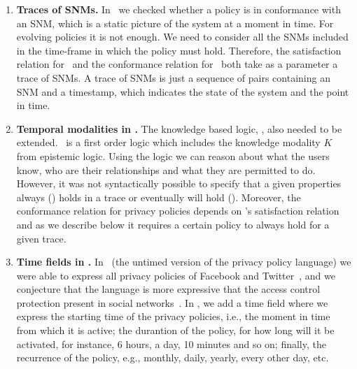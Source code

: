 \begin{enumerate}
\item \textbf{Traces of SNMs.} In \fppf~we checked whether a policy is in conformance with an SNM, which is a static picture of the system at a moment in time. For evolving policies it is not enough. We need to consider all the SNMs included in the time-frame in which the policy must hold. Therefore, the satisfaction relation for \tkbl~and the conformance relation for \tppl~both take as a parameter a trace of SNMs. A trace of SNMs is just a sequence of pairs containing an SNM and a timestamp, which indicates the state of the system and the point in time.
  
\item \textbf{Temporal modalities in \tkbl.} The knowledge based logic, \kbl, also needed to be extended. \kbl~is a first order logic which includes the knowledge modality $K$ from epistemic logic. Using the logic we can reason about what the users know, who are their relationships and what they are permitted to do. However, it was not syntactically possible to specify that a given properties always (\al) holds in a trace or eventually will hold (\ev). Moreover, the conformance relation for privacy policies depends on \tkbl's satisfaction relation and as we describe below it requires a certain policy to always hold for a given trace.
  
\item \textbf{Time fields in \tppl.} In \ppl~(the untimed version of the privacy policy language) we were able to express all privacy policies of Facebook and Twitter~\cite{PS14fpp}, and we conjecture that the language is more expressive that the access control protection present in social networks~\cite{BFS+12rbaceehl,F11rbacppl}. In \tppl, we add a time field where we express the starting time of the privacy policies, i.e., the moment in time from which it is active; the durantion of the policy, for how long will it be activated, for instance, 6 hours, a day, 10 minutes and so on; finally, the recurrence of the policy, e.g., monthly, daily, yearly, every other day, etc.


\end{enumerate}
